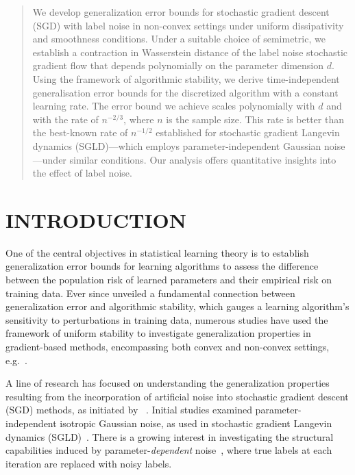 \documentclass{article}
\begin{document}
\onecolumn


\begin{abstract}
  We develop generalization error bounds for stochastic gradient descent (SGD) with label noise in non-convex settings under uniform dissipativity and smoothness conditions. Under a suitable choice of semimetric, we establish a contraction in Wasserstein distance of the label noise stochastic gradient flow that depends polynomially on the parameter dimension $d$. Using the framework of algorithmic stability, we derive time-independent generalisation error bounds for the discretized algorithm with a constant learning rate. The error bound we achieve scales polynomially with $d$ and with the rate of $n^{-2/3}$, where $n$ is the sample size. This rate is better than the best-known rate of $n^{-1/2}$ established for stochastic gradient Langevin dynamics (SGLD)---which employs parameter-independent Gaussian noise---under similar conditions. Our analysis offers quantitative insights into the effect of label noise.
\end{abstract}

\section{INTRODUCTION}

One of the central objectives in statistical learning theory is to establish generalization error bounds for learning algorithms to assess the difference between the population risk of learned parameters and their empirical risk on training data. Ever since \citet{Bousquet} unveiled a fundamental connection between generalization error and algorithmic stability, which gauges a learning algorithm's sensitivity to perturbations in training data, numerous studies have used the framework of uniform stability to investigate generalization properties in gradient-based methods, encompassing both convex and non-convex settings, e.g.~\cite{Hardt, London2017, Mou, Li, Feldman, Bassily2020, Lei20c, farnia2021train, Farghly, lei2021generalization, kozachkov2022generalization, zhu2023uniformintime}.

A line of research has focused on understanding the generalization properties resulting from the incorporation of artificial noise into stochastic gradient descent (SGD) methods, as initiated by \citet{Keskar}~\citep{Pensia, Chaudhari, Mou, Negrea, Amir, Wu2022}. Initial studies examined parameter-independent isotropic Gaussian noise, as used in stochastic gradient Langevin dynamics (SGLD)~\citep{Welling, Hardt, Xu, Raginsky, Mou, Negrea, zhang, Li, Chau, Farghly, zhu2023uniformintime}.
There is a growing interest in investigating the structural capabilities induced by parameter-\emph{dependent} noise~\citep{Goyal, Shallue, Blanc, Damian, li2022happens}, where true labels at each iteration are replaced with noisy labels. 
\end{document}
